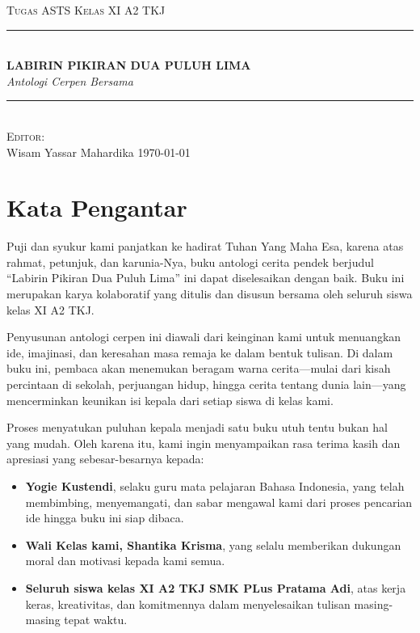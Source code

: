 \documentclass[11pt, openany, a5paper]{memoir}
\begin{document}


\thispagestyle{empty}
\begin{center}
  \vfill
      {\Large\scshape Tugas ASTS Kelas XI A2 TKJ} \\[0.5cm]
      \rule{\linewidth}{1pt} \\[0.8cm]
           {\Huge\bfseries LABIRIN PIKIRAN DUA PULUH LIMA} \\[0.5cm]
           {\large\itshape Antologi Cerpen Bersama} \\[0.8cm]
           \rule{\linewidth}{1pt} \\
           \vfill
               {\small\scshape Editor:}\\
               {\large Wisam Yassar Mahardika}
               \vfill
               \vfill
                   {\small\scshape \today}
                   \vspace*{1cm}
\end{center}
\clearpage

\frontmatter
\pagestyle{plain}

\chapter*{Kata Pengantar}

\noindent Puji dan syukur kami panjatkan ke hadirat Tuhan Yang Maha Esa, karena atas rahmat, petunjuk, dan karunia-Nya, buku antologi cerita pendek berjudul ``Labirin Pikiran Dua Puluh Lima'' ini dapat diselesaikan dengan baik. Buku ini merupakan karya kolaboratif yang ditulis dan disusun bersama oleh seluruh siswa kelas XI A2 TKJ.


Penyusunan antologi cerpen ini diawali dari keinginan kami untuk menuangkan ide, imajinasi, dan keresahan masa remaja ke dalam bentuk tulisan. Di dalam buku ini, pembaca akan menemukan beragam warna cerita---mulai dari kisah percintaan di sekolah, perjuangan hidup, hingga cerita tentang dunia lain---yang mencerminkan keunikan isi kepala dari setiap siswa di kelas kami.


Proses menyatukan puluhan kepala menjadi satu buku utuh tentu bukan hal yang mudah. Oleh karena itu, kami ingin menyampaikan rasa terima kasih dan apresiasi yang sebesar-besarnya kepada:
\begin{itemize}
\item \textbf{Yogie Kustendi}, selaku guru mata pelajaran Bahasa Indonesia, yang telah membimbing, menyemangati, dan sabar mengawal kami dari proses pencarian ide hingga buku ini siap dibaca.
\item \textbf{Wali Kelas kami, Shantika Krisma}, yang selalu memberikan dukungan moral dan motivasi kepada kami semua.
\item \textbf{Seluruh siswa kelas XI A2 TKJ SMK PLus Pratama Adi}, atas kerja keras, kreativitas, dan komitmennya dalam menyelesaikan tulisan masing-masing tepat waktu.
\end{itemize}
\end{document}

